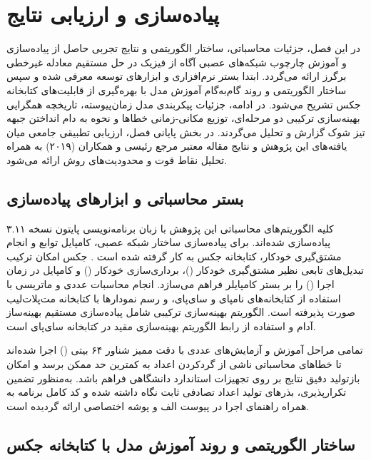 \chapter{پیاده‌سازی و ارزیابی نتایج}
\label{ch:implementation}

در این فصل، جزئیات محاسباتی، ساختار الگوریتمی و نتایج تجربی حاصل از پیاده‌سازی و آموزش چارچوب شبکه‌های عصبی آگاه از فیزیک در حل مستقیم معادله غیرخطی برگرز ارائه می‌گردد. ابتدا بستر نرم‌افزاری و ابزارهای توسعه معرفی شده و سپس ساختار الگوریتمی و روند گام‌به‌گام آموزش مدل با بهره‌گیری از قابلیت‌های کتابخانه جکس تشریح می‌شود. در ادامه، جزئیات پیکربندی مدل زمان‌پیوسته، تاریخچه همگرایی بهینه‌سازی ترکیبی دو مرحله‌ای، توزیع مکانی-زمانی خطاها و نحوه به دام انداختن جبهه تیز شوک گزارش و تحلیل می‌گردند. در بخش پایانی فصل، ارزیابی تطبیقی جامعی میان یافته‌های این پژوهش و نتایج مقاله معتبر مرجع رئیسی و همکاران (۲۰۱۹) به همراه تحلیل نقاط قوت و محدودیت‌های روش ارائه می‌شود.

\section{بستر محاسباتی و ابزارهای پیاده‌سازی}
\label{sec:env}

کلیه الگوریتم‌های محاسباتی این پژوهش با زبان برنامه‌نویسی پایتون نسخه ۳.۱۱ پیاده‌سازی شده‌اند. برای پیاده‌سازی ساختار شبکه عصبی، کامپایل توابع و انجام مشتق‌گیری خودکار، کتابخانه جکس به کار گرفته شده است \cite{jax2018}. جکس امکان ترکیب تبدیل‌های تابعی نظیر مشتق‌گیری خودکار ()، برداری‌سازی خودکار () و کامپایل در زمان اجرا () را بر بستر کامپایلر  فراهم می‌سازد. انجام محاسبات عددی و ماتریسی با استفاده از کتابخانه‌های نامپای و سای‌پای، و رسم نمودارها با کتابخانه مت‌پلات‌لیب صورت پذیرفته است. الگوریتم بهینه‌سازی ترکیبی شامل پیاده‌سازی مستقیم بهینه‌ساز آدام و استفاده از رابط الگوریتم بهینه‌سازی مقید  در کتابخانه سای‌پای است.

تمامی مراحل آموزش و آزمایش‌های عددی با دقت ممیز شناور ۶۴ بیتی () اجرا شده‌اند تا خطاهای محاسباتی ناشی از گردکردن اعداد به کمترین حد ممکن برسد و امکان بازتولید دقیق نتایج بر روی تجهیزات استاندارد دانشگاهی فراهم باشد. به‌منظور تضمین تکرارپذیری، بذرهای تولید اعداد تصادفی ثابت نگاه داشته شده و کد کامل برنامه به همراه راهنمای اجرا در پیوست الف و پوشه اختصاصی  ارائه گردیده است.

\section{ساختار الگوریتمی و روند آموزش مدل با کتابخانه جکس}
\label{sec:jax-algo}

